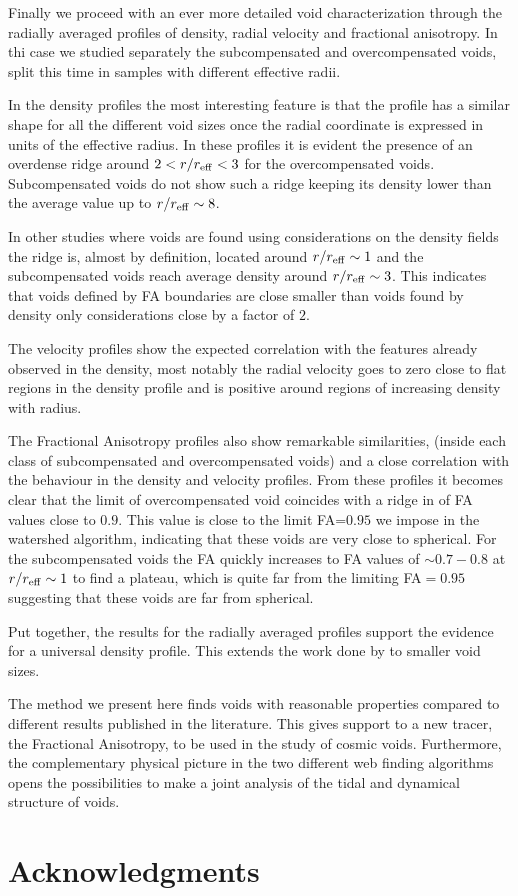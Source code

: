 \documentclass[a4,useAMS,usenatbib,usegraphicx]{mn2e}
\begin{document}
Finally we proceed with an ever more detailed void characterization
through the radially averaged profiles of density, radial velocity and
fractional anisotropy. 
In thi case we studied separately the subcompensated and
overcompensated voids, split this time in samples with different
effective radii.

In the density profiles the most interesting feature is that the 
profile has a similar shape for all the different void sizes once the
radial coordinate is expressed in units of the effective radius. 
In these profiles it is evident the presence of an overdense ridge
around $2<r/r_{\rm eff}<3$ for the overcompensated voids.
Subcompensated voids do not show such a ridge keeping its density
lower than the average value up to $r/r_{\rm eff}\sim 8$.

In other studies where voids are found using considerations on the
density fields the ridge is, almost by definition, located around
$r/r_{\rm eff}\sim 1$ and the subcompensated voids reach average
density around $r/r_{\rm eff}\sim 3$. 
This indicates that voids defined by FA boundaries are close smaller 
than voids found by density only considerations close by a factor of
$2$. 


The velocity profiles show the expected correlation with the features
already observed in the density, most notably the radial velocity goes to
zero close to flat regions in the density profile and is positive around
regions of increasing density with radius. 

The Fractional Anisotropy profiles also show remarkable similarities,
(inside each class of subcompensated and overcompensated voids)
and a close correlation with the behaviour in the density and velocity
profiles. 
From these profiles it becomes clear that the limit of overcompensated
void coincides with a ridge in of FA values close to $0.9$. 
This value is close to the limit FA=$0.95$ we impose in the watershed
algorithm, indicating that these voids are very close to spherical.
For the subcompensated voids the FA quickly increases to FA values of 
$\sim 0.7-0.8$ at $r/r_{\rm eff}\sim 1$ to find a plateau, which is
quite far from the limiting FA$=0.95$ suggesting that these voids are
far from spherical. 

Put together, the results for the radially averaged profiles support the 
evidence for a universal density profile.  
This extends the work done
by \cite{Hamaus14} to smaller void sizes.  

The method we present here finds voids with reasonable properties
compared to different results published in the literature. 
This gives support to a new tracer, the Fractional Anisotropy, to be
used in the study of cosmic voids. 
Furthermore, the complementary physical picture in the two different
web finding algorithms opens the possibilities to make a joint
analysis of the tidal and dynamical structure of voids. 


\section*{Acknowledgments}  



\end{document}
